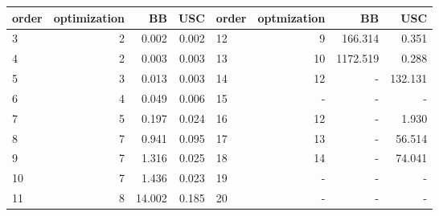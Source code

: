 \begin{tabular}[l]{l|r|r|r||l|r|r|r}
          \hline
          order & optimization & BB & USC & order & optmization & BB & USC \\
          \hline
          3  & 2 & \alert{0.002}  & \alert{0.002}   & 12 & 9  & 166.314  & \alert{0.351}  \\
          4  & 2 & \alert{0.003}  & \alert{0.003}   & 13 & 10 & 1172.519 & \alert{0.288} \\
          5  & 3 & 0.013  & \alert{0.003}   & 14 & 12 & -      & \alert{132.131} \\
          6  & 4 & 0.049  & \alert{0.006}   & 15 & -  & -        & -        \\
          7  & 5 & \alert{0.197}  & 0.024   & 16 & 12 & -       & \alert{1.930} \\
          8  & 7 & \alert{0.941}  & 0.095   & 17 & 13 & -        & \alert{56.514} \\
          9  & 7 & 1.316  & \alert{0.025}   & 18 & 14 & -        & \alert{74.041} \\
          10 & 7 & 1.436  & \alert{0.023}   & 19 & -  & -       & -        \\
          11 & 8 & 14.002  & \alert{0.185}   & 20 & -  & -    & -         \\
          \hline
         \end{tabular}